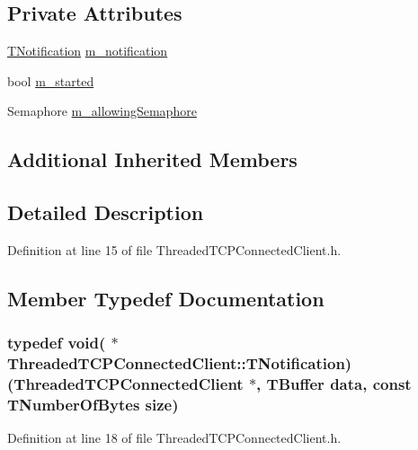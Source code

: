 \subsection*{Private Attributes}
\begin{DoxyCompactItemize}
\item 
\hyperlink{class_threaded_t_c_p_connected_client_a0b2385571a0d98483ddc7ca84bc82cf4}{T\-Notification} \hyperlink{class_threaded_t_c_p_connected_client_a2e4475f9a13d5cfbc34c28449789ef25}{m\-\_\-notification}
\item 
bool \hyperlink{class_threaded_t_c_p_connected_client_ada47374bbca328b7eb6f187af10b32a0}{m\-\_\-started}
\item 
Semaphore \hyperlink{class_threaded_t_c_p_connected_client_a30dd0658adca73cf964dda1b9788f94c}{m\-\_\-allowing\-Semaphore}
\end{DoxyCompactItemize}
\subsection*{Additional Inherited Members}


\subsection{Detailed Description}


Definition at line 15 of file Threaded\-T\-C\-P\-Connected\-Client.\-h.



\subsection{Member Typedef Documentation}
\hypertarget{class_threaded_t_c_p_connected_client_a0b2385571a0d98483ddc7ca84bc82cf4}{
\subsubsection[{T\-Notification}]{\setlength{\rightskip}{0pt plus 5cm}typedef void( $\ast$ Threaded\-T\-C\-P\-Connected\-Client\-::\-T\-Notification)({\bf Threaded\-T\-C\-P\-Connected\-Client} $\ast$, {\bf T\-Buffer} data, const {\bf T\-Number\-Of\-Bytes} size)}}\label{class_threaded_t_c_p_connected_client_a0b2385571a0d98483ddc7ca84bc82cf4}


Definition at line 18 of file Threaded\-T\-C\-P\-Connected\-Client.\-h.



